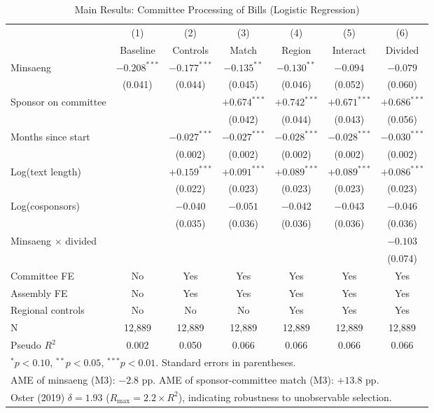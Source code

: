 \documentclass[11pt]{article}
\begin{document}
\begin{table}[H]
\centering
\caption{Main Results: Committee Processing of Bills (Logistic Regression)}
\label{tab:main}
\begin{tabular}{lcccccc}
\toprule
& (1) & (2) & (3) & (4) & (5) & (6) \\
& Baseline & Controls & Match & Region & Interact & Divided \\
\midrule
Minsaeng & $-0.208^{***}$ & $-0.177^{***}$ & $-0.135^{**}$ & $-0.130^{**}$ & $-0.094$ & $-0.079$ \\
& (0.041) & (0.044) & (0.045) & (0.046) & (0.052) & (0.060) \\[4pt]
Sponsor on committee & & & $+0.674^{***}$ & $+0.742^{***}$ & $+0.671^{***}$ & $+0.686^{***}$ \\
& & & (0.042) & (0.044) & (0.043) & (0.056) \\[4pt]
Months since start & & $-0.027^{***}$ & $-0.027^{***}$ & $-0.028^{***}$ & $-0.028^{***}$ & $-0.030^{***}$ \\
& & (0.002) & (0.002) & (0.002) & (0.002) & (0.002) \\[4pt]
Log(text length) & & $+0.159^{***}$ & $+0.091^{***}$ & $+0.089^{***}$ & $+0.089^{***}$ & $+0.086^{***}$ \\
& & (0.022) & (0.023) & (0.023) & (0.023) & (0.023) \\[4pt]
Log(cosponsors) & & $-0.040$ & $-0.051$ & $-0.042$ & $-0.043$ & $-0.046$ \\
& & (0.035) & (0.036) & (0.036) & (0.036) & (0.036) \\[4pt]
Minsaeng $\times$ divided & & & & & & $-0.103$ \\
& & & & & & (0.074) \\
\midrule
Committee FE & No & Yes & Yes & Yes & Yes & Yes \\
Assembly FE & No & Yes & Yes & Yes & Yes & Yes \\
Regional controls & No & No & No & Yes & Yes & Yes \\
N & 12,889 & 12,889 & 12,889 & 12,889 & 12,889 & 12,889 \\
Pseudo $R^2$ & 0.002 & 0.050 & 0.066 & 0.066 & 0.066 & 0.066 \\
\bottomrule
\multicolumn{7}{l}{\footnotesize $^{*}p<0.10$, $^{**}p<0.05$, $^{***}p<0.01$. Standard errors in parentheses.} \\
\multicolumn{7}{l}{\footnotesize AME of minsaeng (M3): $-2.8$ pp. AME of sponsor-committee match (M3): $+13.8$ pp.} \\
\multicolumn{7}{l}{\footnotesize Oster (2019) $\delta = 1.93$ ($R_{\max} = 2.2 \times R^2$), indicating robustness to unobservable selection.} \\
\end{tabular}
\end{table}
\end{document}
